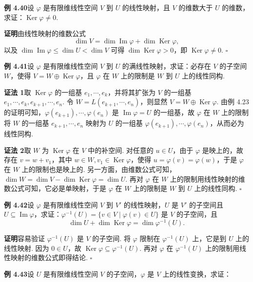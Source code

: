 \documentclass[UTF8,12pt,a4paper,fontset=fandol]{ctexart}
\begin{document}
\noindent\textbf{例 4.40}\quad 设 $\varphi$ 是有限维线性空间 $V$ 到 $U$ 的线性映射，且 $V$ 的维数大于 $U$ 的维数，求证：$\operatorname{Ker}\varphi\ne0$.

\noindent\textbf{证明}\quad 由线性映射的维数公式
\[
\dim V=\dim\operatorname{Im}\varphi+\dim\operatorname{Ker}\varphi,
\]
以及 $\dim\operatorname{Im}\varphi\le\dim U<\dim V$ 可得 $\dim\operatorname{Ker}\varphi>0$，即 $\operatorname{Ker}\varphi\ne0$. $\square$

\noindent\textbf{例 4.41}\quad 设 $\varphi$ 是有限维线性空间 $V$ 到 $U$ 的满线性映射，求证：必存在 $V$ 的子空间 $W$，使得 $V=W\oplus\operatorname{Ker}\varphi$，且 $\varphi$ 在 $W$ 上的限制是 $W$ 到 $U$ 上的线性同构.

\noindent\textbf{证法 1}\quad 取 $\operatorname{Ker}\varphi$ 的一组基 $e_1,\cdots,e_k$，并将其扩张为 $V$ 的一组基 $e_1,\cdots,e_k,e_{k+1},\cdots,e_n$. 令 $W=L(e_{k+1},\cdots,e_n)$，则显然 $V=W\oplus\operatorname{Ker}\varphi$. 由例 4.23 的证明可知，$\varphi(e_{k+1}),\cdots,\varphi(e_n)$ 是 $\operatorname{Im}\varphi=U$ 的一组基，故 $\varphi$ 在 $W$ 上的限制将 $W$ 的一组基 $e_{k+1},\cdots,e_n$ 映射为 $U$ 的一组基 $\varphi(e_{k+1}),\cdots,\varphi(e_n)$，从而必为线性同构.

\noindent\textbf{证法 2}\quad 取 $W$ 为 $\operatorname{Ker}\varphi$ 在 $V$ 中的补空间. 对任意的 $u\in U$，由于 $\varphi$ 是映上的，故存在 $v=w+v_1$，其中 $w\in W,v_1\in\operatorname{Ker}\varphi$，使得 $u=\varphi(v)=\varphi(w)$，于是 $\varphi$ 在 $W$ 上的限制也是映上的. 另一方面，由维数公式可知，$\dim W=\dim V-\dim\operatorname{Ker}\varphi=\dim U$. 再对 $\varphi$ 在 $W$ 上的限制用线性映射的维数公式可知，它必是单映射，于是 $\varphi$ 在 $W$ 上的限制是 $W$ 到 $U$ 上的线性同构. $\square$

\noindent\textbf{例 4.42}\quad 设 $\varphi$ 是有限维线性空间 $V$ 到 $V'$ 的线性映射，$U$ 是 $V'$ 的子空间且 $U\subseteq\operatorname{Im}\varphi$，求证：$\varphi^{-1}(U)=\{v\in V\mid \varphi(v)\in U\}$ 是 $V$ 的子空间，且
\[
\dim U+\dim\operatorname{Ker}\varphi=\dim\varphi^{-1}(U).
\]

\noindent\textbf{证明}\quad 容易验证 $\varphi^{-1}(U)$ 是 $V$ 的子空间. 将 $\varphi$ 限制在 $\varphi^{-1}(U)$ 上，它是到 $U$ 上的线性映射. 因为 $0\in U$，故 $\operatorname{Ker}\varphi\subseteq\varphi^{-1}(U)$. 再对 $\varphi$ 在 $\varphi^{-1}(U)$ 上的限制用线性映射的维数公式即得结论. $\square$

\noindent\textbf{例 4.43}\quad 设 $U$ 是有限维线性空间 $V$ 的子空间，$\varphi$ 是 $V$ 上的线性变换，求证：
\end{document}
